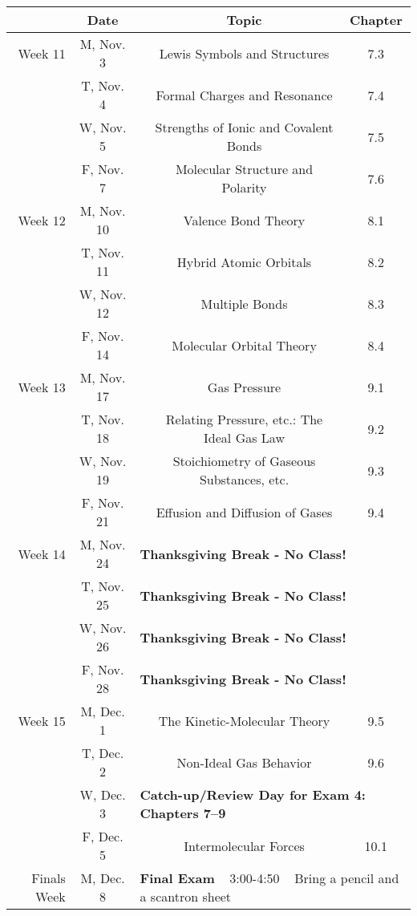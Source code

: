 \documentclass[12pt, letterpaper]{article}
\begin{document}
\noindent
\begin{tabular}{rcccc}
& Date && Topic & Chapter\\
\midrule
Week 11 & M, Nov. 3&& Lewis Symbols and Structures & 7.3\\
& T, Nov. 4&& Formal Charges and Resonance & 7.4\\
& W, Nov. 5&& Strengths of Ionic and Covalent Bonds & 7.5\\
& F, Nov. 7&& Molecular Structure and Polarity & 7.6\\
\midrule
Week 12 & M, Nov. 10&& Valence Bond Theory & 8.1\\
& T, Nov. 11&& Hybrid Atomic Orbitals & 8.2\\
& W, Nov. 12&& Multiple Bonds & 8.3\\
& F, Nov. 14&& Molecular Orbital Theory & 8.4\\
\midrule
Week 13 & M, Nov. 17&& Gas Pressure & 9.1\\
& T, Nov. 18&& Relating Pressure, etc.: The Ideal Gas Law & 9.2\\
& W, Nov. 19&& Stoichiometry of Gaseous Substances, etc. & 9.3\\
& F, Nov. 21&& Effusion and Diffusion of Gases & 9.4\\
\midrule
Week 14 & M, Nov. 24& \multicolumn{3}{l}{\textbf{Thanksgiving Break - No Class!}}\\
& T, Nov. 25& \multicolumn{3}{l}{\textbf{Thanksgiving Break - No Class!}}\\
& W, Nov. 26& \multicolumn{3}{l}{\textbf{Thanksgiving Break - No Class!}}\\
& F, Nov. 28& \multicolumn{3}{l}{\textbf{Thanksgiving Break - No Class!}}\\
\midrule
Week 15 & M, Dec. 1&& The Kinetic-Molecular Theory & 9.5\\
& T, Dec. 2&& Non-Ideal Gas Behavior & 9.6\\
& W, Dec. 3& \multicolumn{3}{l}{\textbf{Catch-up/Review Day for Exam 4: Chapters 7--9}}\\
& F, Dec. 5&& Intermolecular Forces & 10.1\\
\midrule
\midrule
Finals Week & M, Dec. 8 & \multicolumn{3}{l}{\textbf{Final Exam} ~ 3:00-4:50 ~ Bring a pencil and a scantron sheet}\\
\end{tabular}
\end{document}
